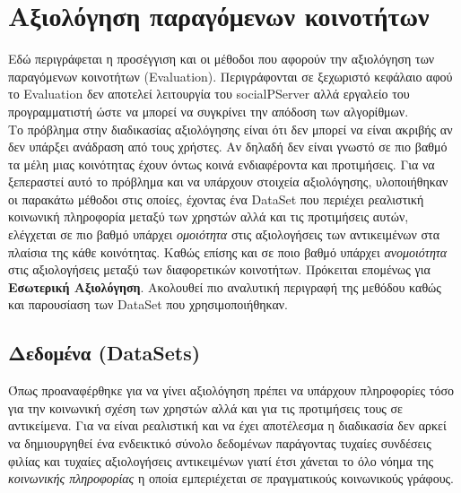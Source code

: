 
\chapter{Αξιολόγηση παραγόμενων κοινοτήτων} %

\label{Αξιολόγηση} %


\noindent
Εδώ περιγράφεται η προσέγγιση και οι μέθοδοι που αφορούν την αξιολόγηση των παραγόμενων κοινοτήτων (Εvaluation). 
Περιγράφονται σε ξεχωριστό κεφάλαιο αφού το Evaluation δεν αποτελεί λειτουργία του socialPServer αλλά εργαλείο του προγραμματιστή ώστε 
να μπορεί να συγκρίνει την απόδοση των αλγορίθμων.\\

Το πρόβλημα στην διαδικασίας αξιολόγησης είναι ότι δεν μπορεί να είναι ακριβής αν δεν υπάρξει ανάδραση από τους χρήστες. 
Αν δηλαδή δεν είναι γνωστό σε πιο βαθμό τα μέλη μιας κοινότητας έχουν όντως κοινά ενδιαφέροντα και προτιμήσεις.
Για να ξεπεραστεί αυτό το πρόβλημα και να υπάρχουν στοιχεία αξιολόγησης, υλοποιήθηκαν οι παρακάτω μέθοδοι στις οποίες,
έχοντας ένα DataSet που περιέχει ρεαλιστική κοινωνική πληροφορία μεταξύ των χρηστών αλλά και τις προτιμήσεις αυτών, ελέγχεται σε πιο βαθμό
υπάρχει \emph{ομοιότητα} στις αξιολογήσεις των αντικειμένων στα πλαίσια της κάθε κοινότητας.
Καθώς επίσης και σε ποιο βαθμό υπάρχει \emph{ανομοιότητα} στις αξιολογήσεις μεταξύ των διαφορετικών κοινοτήτων. 
Πρόκειται επομένως για \textbf{Εσωτερική Αξιολόγηση}.
Ακολουθεί πιο αναλυτική περιγραφή της μεθόδου καθώς και παρουσίαση των DataSet που χρησιμοποιήθηκαν.


\section{Δεδομένα (DataSets)}
\noindent
Όπως προαναφέρθηκε για να γίνει αξιολόγηση πρέπει να υπάρχουν πληροφορίες τόσο για την κοινωνική σχέση των χρηστών αλλά και για τις προτιμήσεις τους σε αντικείμενα.
Για να είναι ρεαλιστική και να έχει αποτέλεσμα η διαδικασία δεν αρκεί να δημιουργηθεί ένα ενδεικτικό σύνολο δεδομένων παράγοντας τυχαίες συνδέσεις φιλίας
και τυχαίες αξιολογήσεις αντικειμένων γιατί έτσι χάνεται το όλο νόημα της \emph{κοινωνικής πληροφορίας} η οποία εμπεριέχεται σε πραγματικούς κοινωνικούς γράφους.

